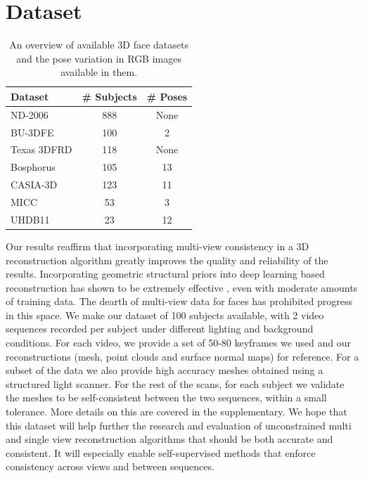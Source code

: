 \documentclass[10pt,twocolumn,letterpaper]{article}
\begin{document}

\section{Dataset}
\begin{table}
\begin{center}
\begin{tabular}{|l|c| c|}
\hline
Dataset & \# Subjects & \# Poses \\
\hline\hline
ND-2006 & 888 & None \\
BU-3DFE & 100 & 2 \\
Texas 3DFRD & 118 & None\\
Bosphorus & 105 & 13\\
CASIA-3D & 123 & 11\\
MICC & 53 & 3\\
UHDB11 & 23 & 12\\
\hline
\end{tabular}
\end{center}
\caption{An overview of available 3D face datasets and the pose variation in RGB images available in them.}
\end{table}

Our results reaffirm that incorporating multi-view consistency in a 3D reconstruction algorithm greatly improves the quality and reliability of the results. Incorporating geometric structural priors into deep learning based reconstruction has shown to be extremely effective \cite{yao2018mvsnet}, even with moderate amounts of training data. The dearth of multi-view data for faces has prohibited progress in this space. We make our dataset of 100 subjects available, with 2 video sequences recorded per subject under different lighting and background conditions. For each video, we provide a set of 50-80 keyframes we used and our reconstructions (mesh, point clouds and surface normal maps) for reference. For a subset of the data we also provide high accuracy meshes obtained using a structured light scanner. For the rest of the scans, for each subject we validate the meshes to be self-consistent between the two sequences, within a small tolerance. More details on this are covered in the supplementary.
We hope that this dataset will help further the research and evaluation of unconstrained multi and single view reconstruction algorithms that should be both accurate and consistent. It will especially enable self-supervised methods that enforce consistency across views and between sequences.
\end{document}
